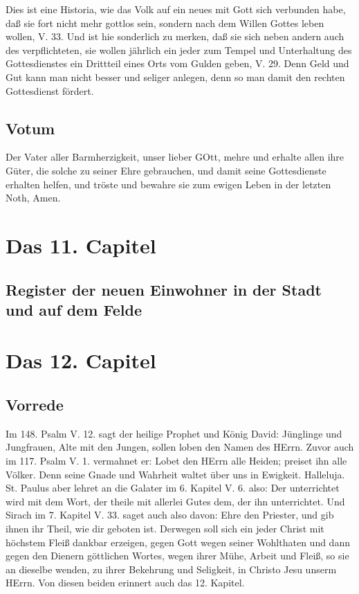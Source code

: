 Dies ist eine Historia, wie das Volk auf ein neues mit Gott sich verbunden habe, daß sie fort nicht mehr gottlos sein, sondern nach dem Willen Gottes leben wollen, V. 33. Und ist hie sonderlich zu merken, daß sie sich neben andern auch des verpflichteten, sie wollen jährlich ein jeder zum Tempel und Unterhaltung des Gottesdienstes ein Drittteil eines Orts vom Gulden geben, V. 29. Denn Geld und Gut kann man nicht besser und seliger anlegen, denn so man damit den rechten Gottesdienst fördert.

\section{Votum}

Der Vater aller Barmherzigkeit, unser lieber GOtt, mehre und erhalte allen ihre Güter, die solche zu seiner Ehre gebrauchen, und damit seine Gottesdienste erhalten helfen, und tröste und bewahre sie zum ewigen Leben in der letzten Noth, Amen.

\chapter{Das 11. Capitel}

\section[Register der neuen Einwohner in der Stadt und]{Register der neuen Einwohner in der Stadt und auf dem Felde}


\chapter{Das 12. Capitel}

\section{Vorrede}

Im 148. Psalm V. 12. sagt der heilige Prophet und König David: Jünglinge und Jungfrauen, Alte mit den Jungen, sollen loben den Namen des HErrn. Zuvor auch im 117. Psalm V. 1. vermahnet er: Lobet den HErrn alle Heiden; preiset ihn alle Völker. Denn seine Gnade und Wahrheit waltet über uns in Ewigkeit. Halleluja. St. Paulus aber lehret an die Galater im 6. Kapitel V. 6. also: Der unterrichtet wird mit dem Wort, der theile mit allerlei Gutes dem, der ihn unterrichtet. Und Sirach im 7. Kapitel V. 33. saget auch also davon: Ehre den Priester, und gib ihnen ihr Theil, wie dir geboten ist. Derwegen soll sich ein jeder Christ mit höchstem Fleiß dankbar erzeigen, gegen Gott wegen seiner Wohlthaten und dann gegen den Dienern göttlichen Wortes, wegen ihrer Mühe, Arbeit und Fleiß, so sie an dieselbe wenden, zu ihrer Bekehrung und Seligkeit, in Christo Jesu unserm HErrn. Von diesen beiden erinnert auch das 12. Kapitel.

